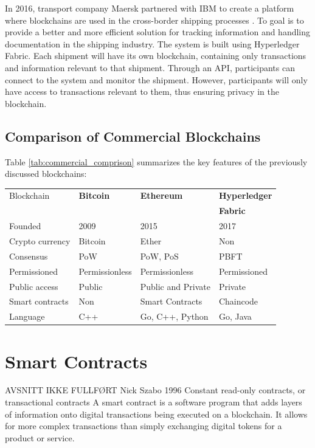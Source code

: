 In 2016, transport company Maersk partnered with IBM to create a platform where blockchains are used in the cross-border shipping processes \cite{tu}. To goal is to provide a better and more efficient solution for tracking information and handling documentation in the shipping industry. The system is built using Hyperledger Fabric. Each shipment will have its own blockchain, containing only transactions and information relevant to that shipment. Through an API, participants can connect to the system and monitor the shipment. However, participants will only have access to transactions relevant to them, thus ensuring privacy in the blockchain.

\subsection{Comparison of Commercial Blockchains}
Table \ref{tab:commercial_comprison} summarizes the key features of the previously discussed blockchains: 
\begin{center}
\label{tab:commercial_comprison}
\begin{tabular}{ |l|l|l|l|} 
   
   \hline
   Blockchain  & \textbf{Bitcoin} & \textbf{Ethereum} & \textbf{Hyperledger} \\
    & & & \textbf{Fabric} \\ 
   \hline
   Founded & 2009 & 2015 & 2017 \\
   	\hline
   Crypto currency & Bitcoin & Ether & Non \\
   	\hline
   Consensus & PoW & PoW, PoS & PBFT \\
   	\hline
   Permissioned & Permissionless & Permissionless & Permissioned \\
   	\hline
   Public access & Public & Public and Private & Private \\
   	\hline
   Smart contracts & Non & Smart Contracts & Chaincode \\
   	\hline
   Language & C++ & Go, C++, Python & Go, Java \\
   	\hline

\end{tabular}
\end{center}

\section{Smart Contracts}
AVSNITT IKKE FULLFØRT
Nick Szabo 1996
Constant read-only contracts, or transactional contracts
A smart contract is a software program that adds layers of information onto digital transactions being executed on a blockchain. It allows for more complex transactions than simply exchanging digital tokens for a product or service.

